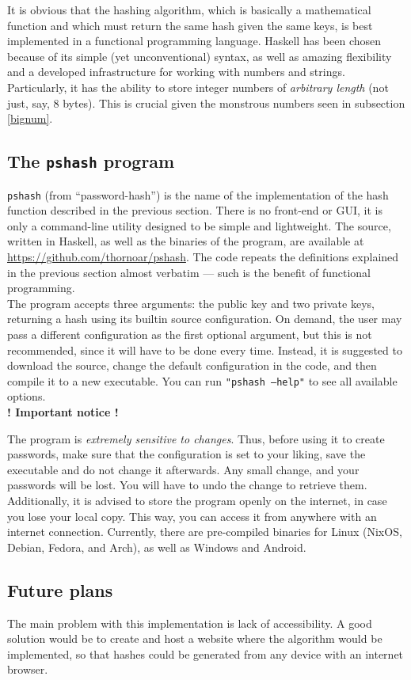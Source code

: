 \documentclass[12pt, a4paper]{article}
\begin{document}
It is obvious that the hashing algorithm, which is basically a mathematical function and which must return the same hash given the same keys, is best implemented in a functional programming language. Haskell has been chosen because of its simple (yet unconventional) syntax, as well as amazing flexibility and a developed infrastructure for working with numbers and strings. Particularly, it has the ability to store integer numbers of \emph{arbitrary length} (not just, say, 8 bytes). This is crucial given the monstrous numbers seen in subsection \ref{bignum}.

\subsection{The \texttt{pshash} program}

\texttt{pshash} (from ``password-hash'') is the name of the implementation of the hash function described in the previous section. There is no front-end or GUI, it is only a command-line utility designed to be simple and lightweight. The source, written in Haskell, as well as the binaries of the program, are available at \url{https://github.com/thornoar/pshash}. The code repeats the definitions explained in the previous section almost verbatim --- such is the benefit of functional programming.\\

The program accepts three arguments: the public key and two private keys, returning a hash using its builtin source configuration. On demand, the user may pass a different configuration as the first optional argument, but this is not recommended, since it will have to be done every time. Instead, it is suggested to download the source, change the default configuration in the code, and then compile it to a new executable. You can run \texttt{"pshash~--help"} to see all available options.\\

\textbf{! Important notice !}

The program is \emph{extremely sensitive to changes}. Thus, before using it to create passwords, make sure that the configuration is set to your liking, save the executable and do not change it afterwards. Any small change, and your passwords will be lost. You will have to undo the change to retrieve them. Additionally, it is advised to store the program openly on the internet, in case you lose your local copy. This way, you can access it from anywhere with an internet connection. Currently, there are pre-compiled binaries for Linux (NixOS, Debian, Fedora, and Arch), as well as Windows and Android.

\subsection{Future plans}

The main problem with this implementation is lack of accessibility. A good solution would be to create and host a website where the algorithm would be implemented, so that hashes could be generated from any device with an internet browser.
\end{document}
